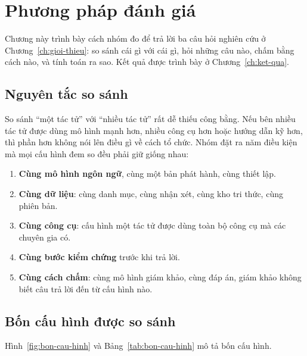 \chapter{Phương pháp đánh giá}
\label{ch:phuong-phap}

Chương này trình bày cách nhóm đo để trả lời ba câu hỏi nghiên cứu ở Chương~\ref{ch:gioi-thieu}: so sánh cái gì với cái gì, hỏi những câu nào, chấm bằng cách nào, và tính toán ra sao. Kết quả được trình bày ở Chương~\ref{ch:ket-qua}.

\section{Nguyên tắc so sánh}

So sánh ``một tác tử'' với ``nhiều tác tử'' rất dễ thiếu công bằng. Nếu bên nhiều tác tử được dùng mô hình mạnh hơn, nhiều công cụ hơn hoặc hướng dẫn kỹ hơn, thì phần hơn không nói lên điều gì về cách tổ chức. Nhóm đặt ra năm điều kiện mà mọi cấu hình đem so đều phải giữ giống nhau:

\begin{enumerate}
    \item \textbf{Cùng mô hình ngôn ngữ}, cùng một bản phát hành, cùng thiết lập.
    \item \textbf{Cùng dữ liệu}: cùng danh mục, cùng nhận xét, cùng kho tri thức, cùng phiên bản.
    \item \textbf{Cùng công cụ}: cấu hình một tác tử được dùng toàn bộ công cụ mà các chuyên gia có.
    \item \textbf{Cùng bước kiểm chứng} trước khi trả lời.
    \item \textbf{Cùng cách chấm}: cùng mô hình giám khảo, cùng đáp án, giám khảo không biết câu trả lời đến từ cấu hình nào.
\end{enumerate}

\section{Bốn cấu hình được so sánh}
\label{sec:bon-cau-hinh}

Hình~\ref{fig:bon-cau-hinh} và Bảng~\ref{tab:bon-cau-hinh} mô tả bốn cấu hình.


